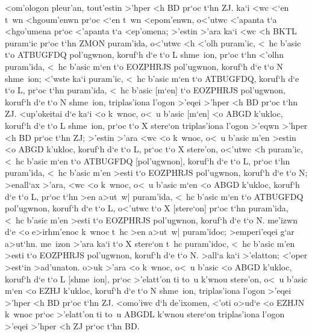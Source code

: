 \begin{Parallel}{}{}
{{<om'ologon pleur'an, tout'estin >'hper <h BD pr`oc t`hn ZJ. ka`i <wc <`en t~wn
<hgoum'enwn pr`oc <`en t~wn <epom'enwn, o<'utwc <'apanta t`a <hgo'umena
pr`oc <'apanta t`a <ep'omena; >'estin >'ara ka`i <wc <h BKTL puram`ic pr`oc
t`hn ZMON puram'ida, o<'utwc <h <'olh puram'ic, <~hc b'asic t`o ATBUGFDQ pol'ugwnon,
koruf`h d`e t`o L shme~ion, pr`oc t`hn <'olhn puram'ida, <~hc b'asic m`en t`o EOZPHRJS pol'ugwnon,
koruf`h d`e t`o N shme~ion; <'wste ka`i puram'ic, <~hc b'asic m`en t`o ATBUGFDQ, koruf`h
d`e t`o L, pr`oc t`hn puram'ida, <~hc b'asic [m`en] t`o EOZPHRJS pol'ugwnon, koruf`h
d`e t`o N shme~ion, triplas'iona l'ogon >'eqei >'hper <h BD pr`oc t`hn ZJ. <up'okeitai d`e ka`i
<o k~wnoc, o<~u b'asic [m`en]
<o ABGD k'ukloc, koruf`h d`e t`o L shme~ion, pr`oc t`o X stere`on triplas'iona l'ogon >'eqwn
>'hper <h BD pr`oc t`hn ZJ;  >'estin >'ara <wc <o k~wnoc, o<~u b'asic m'en >estin <o ABGD k'ukloc,
koruf`h d`e t`o L, pr`oc t`o X stere'on, o<'utwc <h puram'ic, <~hc b'asic m`en t`o ATBUGFDQ [pol'ugwnon],
koruf`h d`e t`o L, pr`oc t`hn puram'ida, <~hc b'asic m'en >esti t`o EOZPHRJS pol'ugwnon, koruf`h
d`e t`o N; >enall`ax >'ara, <wc <o k~wnoc, o<~u b'asic m`en <o ABGD k'ukloc, koruf`h d`e
t`o L, pr`oc t`hn >en a>ut~w| puram'ida, <~hc b'asic m`en t`o ATBUGFDQ pol'ugwnon, koruf`h
d`e t`o L, o<'utwc t`o X [stere`on] pr`oc t`hn puram'ida, <~hc b'asic m'en >esti t`o EOZPHRJS
pol'ugwnon, koruf`h d`e t`o N. me'izwn d`e <o e>irhm'enoc k~wnoc t~hc >en a>ut~w|
puram'idoc; >emperi'eqei g`ar a>ut`hn. me~izon >'ara ka`i t`o X stere`on t~hc puram'idoc, <~hc b'asic
m'en >esti t`o EOZPHRJS pol'ugwnon, koruf`h d`e t`o N. >all`a ka`i >'elatton; <'oper >est`in >ad'unaton.
o>uk >'ara <o k~wnoc, o<~u b'asic <o ABGD k'ukloc, koruf`h d`e t`o L [shme~ion], pr`oc >'elatt'on
ti to~u k'wnou stere'on, o<~u b'asic m`en <o EZHJ k'ukloc, koruf`h d`e t`o N shme~ion, triplas'iona
l'ogon >'eqei >'hper <h BD pr`oc t`hn ZJ. <omo'iwc d`h de'ixomen, <'oti o>ud`e <o EZHJN k~wnoc
pr`oc >'elatt'on ti to~u ABGDL k'wnou stere`on triplas'iona l'ogon >'eqei >'hper <h ZJ pr`oc t`hn BD.}



}
\end{Parallel}

